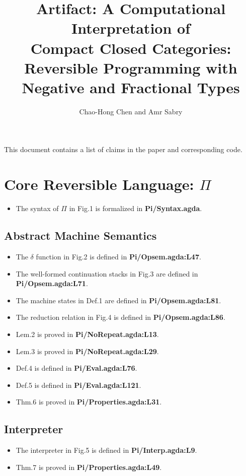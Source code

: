 \documentclass{article}
\begin{document}
\title{Artifact: A Computational Interpretation of \\
  Compact Closed Categories: \\
  Reversible Programming with Negative and Fractional Types}
\author{Chao-Hong Chen and Amr Sabry}
\maketitle
\noindent
This document contains a list of claims in the paper and corresponding code.

\section{Core Reversible Language: $\Pi$}

\begin{itemize}
\item The syntax of $\Pi$ in Fig.1 is formalized in \textbf{Pi/Syntax.agda}.
\end{itemize}

\subsection{Abstract Machine Semantics}
\begin{itemize}
\item The $\delta$ function in Fig.2 is defined in \textbf{Pi/Opsem.agda:L47}.
\item The well-formed continuation stacks in Fig.3 are defined in \textbf{Pi/Opsem.agda:L71}.
\item The machine states in Def.1 are defined in \textbf{Pi/Opsem.agda:L81}.
\item The reduction relation in Fig.4 is defined in \textbf{Pi/Opsem.agda:L86}.
\item Lem.2 is proved in \textbf{Pi/NoRepeat.agda:L13}.
\item Lem.3 is proved in \textbf{Pi/NoRepeat.agda:L29}.
\item Def.4 is defined in \textbf{Pi/Eval.agda:L76}.
\item Def.5 is defined in \textbf{Pi/Eval.agda:L121}.
\item Thm.6 is proved in \textbf{Pi/Properties.agda:L31}.
\end{itemize}
\subsection{Interpreter}
\begin{itemize}
\item The interpreter in Fig.5 is defined in \textbf{Pi/Interp.agda:L9}.
\item Thm.7 is proved in \textbf{Pi/Properties.agda:L49}.
\end{itemize}
\end{document}
